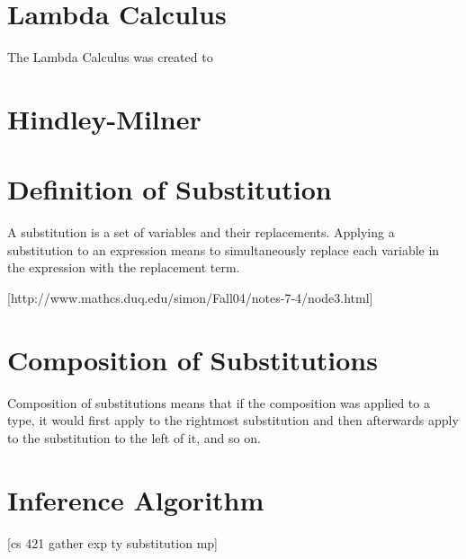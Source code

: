 \section{Lambda Calculus}
The Lambda Calculus was created to

\section{Hindley-Milner}

\section{Definition of Substitution}
A substitution is a set of variables and their replacements. Applying a substitution to an expression means to simultaneously replace each variable in the expression with the replacement term.

[http://www.mathcs.duq.edu/simon/Fall04/notes-7-4/node3.html]

\section{Composition of Substitutions}

Composition of substitutions means that if the composition was applied to a type, it would first apply to the rightmost substitution and then afterwards apply to the substitution to the left of it, and so on.

\section{Inference Algorithm}

[cs 421 gather exp ty substitution mp]

